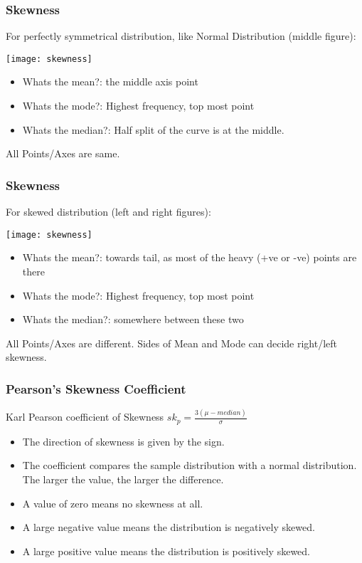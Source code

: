 \begin{frame}[fragile]\frametitle{Skewness}	
For perfectly symmetrical distribution, like Normal Distribution (middle figure):
\begin{center}
\texttt{[image: skewness]}
\end{center}
\begin{itemize}
\item  Whats the mean?: the middle axis point
\item Whats the mode?: Highest frequency, top most point
\item Whats the median?: Half split of the curve is at the middle.
\end{itemize}
All Points/Axes are same.
\end{frame}

\begin{frame}[fragile]\frametitle{Skewness}	
For skewed distribution (left and right figures):
\begin{center}
\texttt{[image: skewness]}
\end{center}
\begin{itemize}
\item Whats the mean?: towards tail, as most of the heavy (+ve or -ve) points are there
\item Whats the mode?: Highest frequency, top most point
\item Whats the median?: somewhere between these two
\end{itemize}
All Points/Axes are different. Sides of Mean and Mode can decide right/left skewness.
\end{frame}

\begin{frame}[fragile]\frametitle{Pearson's Skewness Coefficient}	
Karl Pearson coefficient of Skewness 
$sk_p = \frac{3(\mu - median)}{\sigma}$

\begin{itemize}
\item  The direction of skewness is given by the sign.
\item The coefficient compares the sample distribution with a normal distribution. The larger the value, the larger the difference.
\item A value of zero means no skewness at all.
\item A large negative value means the distribution is negatively skewed.
\item A large positive value means the distribution is positively skewed.
\end{itemize}

\end{frame}

